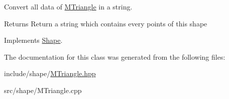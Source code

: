 Convert all data of \hyperlink{classMTriangle}{M\+Triangle} in a string. 

\begin{DoxyReturn}{Returns}
Return a string which contains every points of this shape 
\end{DoxyReturn}


Implements \hyperlink{classShape_a98fa87c6dc4c7045fd6897a8f3bc186c}{Shape}.



The documentation for this class was generated from the following files\+:\begin{DoxyCompactItemize}
\item 
include/shape/\hyperlink{MTriangle_8hpp}{M\+Triangle.\+hpp}\item 
src/shape/M\+Triangle.\+cpp\end{DoxyCompactItemize}
